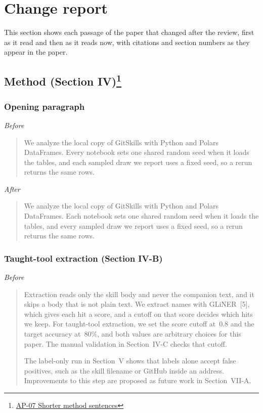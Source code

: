 \section{Change report}
\label{sec:changes}

This section shows each passage of the paper that changed after the review, first as it read and then as it reads now, with citations and section numbers as they appear in the paper.

\subsection*{Method (Section IV)\footnote{\hyperref[ap:07]{AP-07 Shorter method sentences}}}

\subsubsection*{Opening paragraph}

\textit{Before}
\begin{quote}
We analyze the local copy of GitSkills with Python and Polars DataFrames.
Every notebook sets one shared random seed when it loads the tables, and each sampled draw we report uses a fixed seed, so a rerun returns the same rows.
\end{quote}

\noindent\textit{After}
\begin{quote}
We analyze the local copy of GitSkills with Python and Polars DataFrames.
Each notebook sets one shared random seed when it loads the tables, and every sampled draw we report uses a fixed seed, so a rerun returns the same rows.
\end{quote}

\subsubsection*{Taught-tool extraction (Section IV-B)}

\textit{Before}
\begin{quote}
Extraction reads only the skill body and never the companion text, and it skips a body that is not plain text.
We extract names with GLiNER~[5], which gives each hit a score, and a cutoff on that score decides which hits we keep.
For taught-tool extraction, we set the score cutoff at~$0.8$ and the target accuracy at~$80\%$, and both values are arbitrary choices for this paper.
The manual validation in Section~IV-C checks that cutoff.

The label-only run in Section~V shows that labels alone accept false positives, such as the skill filename or GitHub inside an address.
Improvements to this step are proposed as future work in Section~VII-A.
\end{quote}

